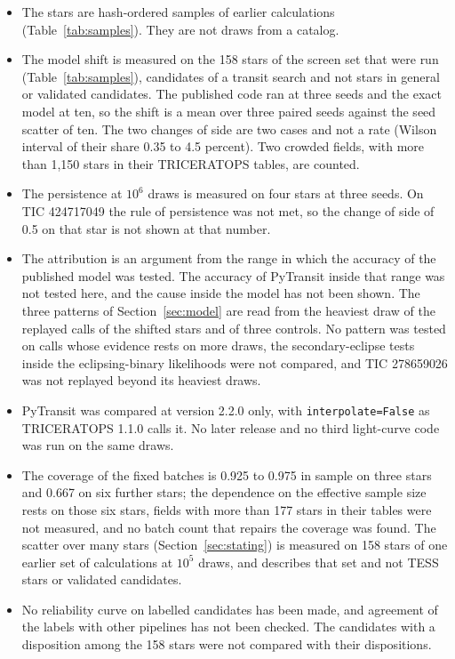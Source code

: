 \documentclass[11pt]{article}
\begin{document}
\begin{itemize}
\item The stars are hash-ordered samples of earlier calculations (Table~\ref{tab:samples}). They are not draws from a catalog.
\item The model shift is measured on the 158 stars of the screen set that were run (Table~\ref{tab:samples}), candidates of a transit search and not stars in general or validated candidates. The published code ran at three seeds and the exact model at ten, so the shift is a mean over three paired seeds against the seed scatter of ten. The two changes of side are two cases and not a rate (Wilson interval of their share 0.35 to 4.5 percent). Two crowded fields, with more than 1,150 stars in their TRICERATOPS tables, are counted.
\item The persistence at $10^{6}$ draws is measured on four stars at three seeds. On TIC 424717049 the rule of persistence was not met, so the change of side of 0.5 on that star is not shown at that number.
\item The attribution is an argument from the range in which the accuracy of the published model was tested. The accuracy of PyTransit inside that range was not tested here, and the cause inside the model has not been shown. The three patterns of Section~\ref{sec:model} are read from the heaviest draw of the replayed calls of the shifted stars and of three controls. No pattern was tested on calls whose evidence rests on more draws, the secondary-eclipse tests inside the eclipsing-binary likelihoods were not compared, and TIC 278659026 was not replayed beyond its heaviest draws.
\item PyTransit was compared at version 2.2.0 only, with \texttt{interpolate=False} as TRICERATOPS 1.1.0 calls it. No later release and no third light-curve code was run on the same draws.
\item The coverage of the fixed batches is 0.925 to 0.975 in sample on three stars and 0.667 on six further stars; the dependence on the effective sample size rests on those six stars, fields with more than 177 stars in their tables were not measured, and no batch count that repairs the coverage was found. The scatter over many stars (Section~\ref{sec:stating}) is measured on 158 stars of one earlier set of calculations at $10^{5}$ draws, and describes that set and not TESS stars or validated candidates.
\item No reliability curve on labelled candidates has been made, and agreement of the labels with other pipelines has not been checked. The candidates with a disposition among the 158 stars were not compared with their dispositions.

\end{itemize}
\end{document}
